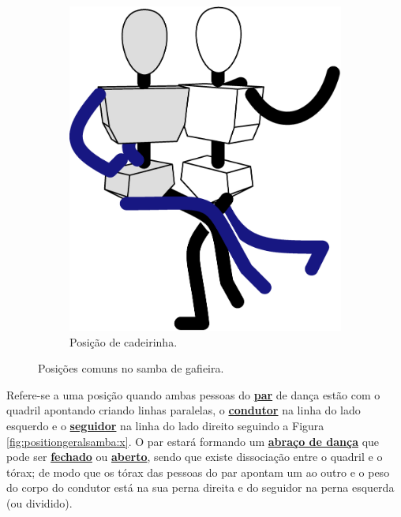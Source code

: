 \begin{figure}[!ht]
\begin{subfigure}[b]{0.295\textwidth}
         \includegraphics[width=\textwidth]{chapters/cap-normas/position-cadeirinha.eps}
         \caption{Posição de cadeirinha.}
         \label{fig:positiongeralsamba:cadeirinha}
     \end{subfigure}
\caption{Posições comuns no samba de gafieira.}
\label{fig:positiongeralsamba}
\end{figure}

\begin{definition}[Posição de X:]
\label{def:X-position} 
Refere-se a uma posição quando ambas pessoas do \hyperref[def:Par]{\textbf{par}} 
de dança estão com o quadril apontando criando linhas paralelas,
o \hyperref[def:Condutor]{\textbf{condutor}} na linha do lado esquerdo e
o \hyperref[def:Seguidor]{\textbf{seguidor}} na linha do lado direito seguindo a Figura \ref{fig:positiongeralsamba:x}.
O par estará formando um \hyperref[def:abracodedanca]{\textbf{abraço de dança}}
que pode ser \hyperref[def:closed-position]{\textbf{fechado}} 
ou \hyperref[def:open-position]{\textbf{aberto}},
sendo que existe dissociação entre o quadril e o tórax;
de modo que os tórax das pessoas do par apontam um ao outro e 
o peso do corpo do condutor está na sua perna direita e do seguidor na perna esquerda (ou dividido).
\end{definition}

